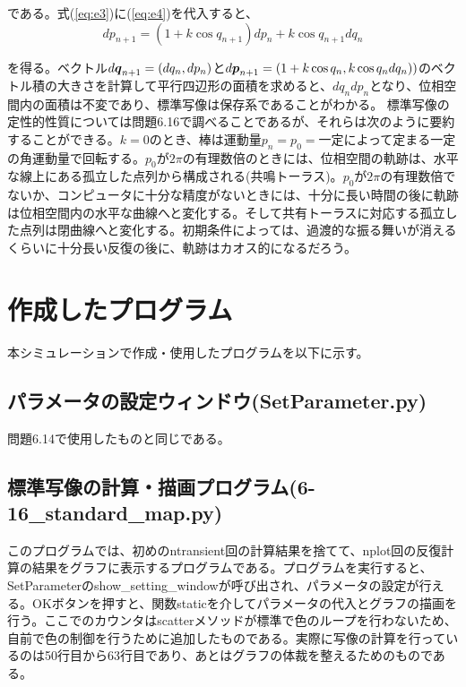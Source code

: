 \documentclass{jsarticle}
\begin{document}
        である。式(\ref{eq:e3})に(\ref{eq:e4})を代入すると、
        \begin{equation}
            dp_{n+1} = (1 + k \cos q_{n+1})dp_{n} + k\cos q_{n+1} dq_{n}
        \end{equation}
        
        を得る。ベクトル$d\mbox{\boldmath$q$}_{n+1} = (dq_{n}, dp_{n})$と$d\mbox{\boldmath$p$}_{n+1} = (1 + k\cos q_{n}, k\cos q_{n} dq_{n}))$のベクトル積の大きさを計算して平行四辺形の面積を求めると、$dq_{n}dp_{n}$となり、位相空間内の面積は不変であり、標準写像は保存系であることがわかる。
        標準写像の定性的性質については問題6.16で調べることであるが、それらは次のように要約することができる。$k=0$のとき、棒は運動量$p_{n} = p_{0} = 一定$によって定まる一定の角運動量で回転する。$p_{0}$が$2\pi$の有理数倍のときには、位相空間の軌跡は、水平な線上にある孤立した点列から構成される(共鳴トーラス)。$p_{0}$が$2\pi$の有理数倍でないか、コンピュータに十分な精度がないときには、十分に長い時間の後に軌跡は位相空間内の水平な曲線へと変化する。そして共有トーラスに対応する孤立した点列は閉曲線へと変化する。初期条件によっては、過渡的な振る舞いが消えるくらいに十分長い反復の後に、軌跡はカオス的になるだろう。
    \section{作成したプログラム}
        本シミュレーションで作成・使用したプログラムを以下に示す。
    
    
        \subsection{パラメータの設定ウィンドウ(SetParameter.py)}
            問題6.14で使用したものと同じである。
        
        \subsection{標準写像の計算・描画プログラム(6-16\_standard\_map.py)}
            このプログラムでは、初めのntransient回の計算結果を捨てて、nplot回の反復計算の結果をグラフに表示するプログラムである。プログラムを実行すると、SetParameterのshow\_setting\_windowが呼び出され、パラメータの設定が行える。OKボタンを押すと、関数staticを介してパラメータの代入とグラフの描画を行う。ここでのカウンタはscatterメソッドが標準で色のループを行わないため、自前で色の制御を行うために追加したものである。実際に写像の計算を行っているのは50行目から63行目であり、あとはグラフの体裁を整えるためのものである。
        
\end{document}
